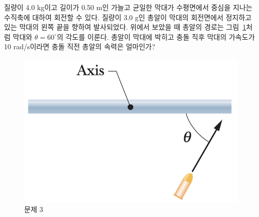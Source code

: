 \documentclass[floatfix,nofootinbib,superscriptaddress,fleqn]{revtex4-2}
\begin{document}
\vspace{1.cm}


질량이 4.0 kg이고 길이가 0.50 m인 가늘고 균일한 막대가 수평면에서
중심을 지나는 수직축에 대하여 회전할 수 있다. 질량이 3.0 g인 총알이
막대의 회전면에서 정지하고 있는 막대의 왼쪽 끝을 향하여
발사되었다. 위에서 보았을 때 총알의 경로는 그림~\ref{fig:3}처럼 막대와
$\theta=60^\circ$의 각도를 이룬다. 총알이 막대에 박히고 충돌 직후
막대의 가속도가 10 rad/s이라면 충돌 직전 총알의 속력은 얼마인가? 
\begin{figure}[ht]
  \centering
\includegraphics[scale=0.4]{Qfig14-3-20220427.png}
  \caption{문제 3}
  \label{fig:3}
\end{figure}
\end{document}
